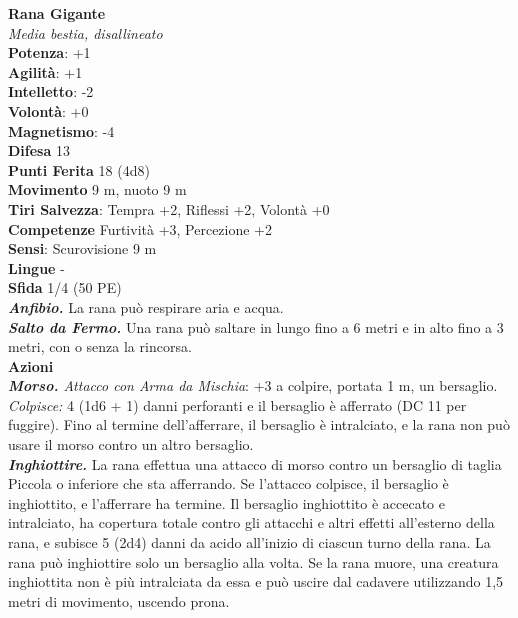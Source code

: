 \begin{multicols}{2}
\medskip\textbf{Rana Gigante}\\
\emph{Media bestia, disallineato}\\
\textbf{Potenza}: +1\\
\textbf{Agilità}: +1\\
\textbf{Intelletto}: -2\\
\textbf{Volontà}: +0\\
\textbf{Magnetismo}: -4\\
\textbf{Difesa} 13\\
\textbf{Punti Ferita} 18 (4d8)\\
\textbf{Movimento} 9 m, nuoto 9 m\\
\textbf{Tiri Salvezza}: Tempra +2, Riflessi +2, Volontà +0 \\
\textbf{Competenze} Furtività +3, Percezione +2\\
\textbf{Sensi}: Scurovisione 9 m\\
\textbf{Lingue} -\\
\textbf{Sfida} 1/4 (50 PE)\smallskip\\
\emph{\textbf{Anfibio.}} La rana può respirare aria e acqua.\\
\emph{\textbf{Salto da Fermo.}} Una rana può saltare in lungo fino a 6 metri e in alto fino a 3 metri, con o senza la rincorsa.\\
\smallskip\textbf{Azioni}\\
\emph{\textbf{Morso.} Attacco con Arma da Mischia}: +3 a colpire, portata 1 m, un bersaglio.\\
\emph{Colpisce:} 4 (1d6 + 1) danni perforanti e il bersaglio è afferrato (DC 11 per fuggire). Fino al termine dell'afferrare, il bersaglio è intralciato, e la rana non può usare il morso contro un altro bersaglio.\\
\emph{\textbf{Inghiottire.}} La rana effettua una attacco di morso contro un bersaglio di taglia Piccola o inferiore che sta afferrando. Se l'attacco colpisce, il bersaglio è inghiottito, e l'afferrare ha termine. Il bersaglio inghiottito è accecato e intralciato, ha copertura totale contro gli attacchi e altri effetti all'esterno della rana, e subisce 5 (2d4) danni da acido all'inizio di ciascun turno della rana. La rana può inghiottire solo un bersaglio alla volta. Se la rana muore, una creatura inghiottita non è più intralciata da essa e può uscire dal cadavere utilizzando 1,5 metri di movimento, uscendo prona.\\


\end{multicols}
